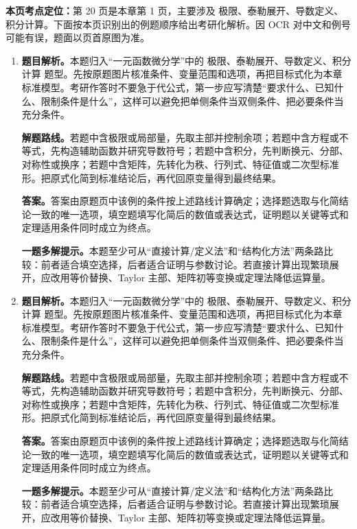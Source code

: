\begin{solutionblock}
\textbf{本页考点定位：}第 20 页是本章第 1 页，主要涉及 极限、泰勒展开、导数定义、积分计算。下面按本页识别出的例题顺序给出考研化解析。因 OCR 对中文和例号可能有误，题面以页首原图为准。

\begin{enumerate}[label=\textbf{例\arabic*.}, leftmargin=2.4em]

\item \textbf{题目解析。}本题归入“一元函数微分学”中的 极限、泰勒展开、导数定义、积分计算 题型。先按原题图片核准条件、变量范围和选项，再把目标式化为本章标准模型。考研作答时不要急于代公式，第一步应写清楚“要求什么、已知什么、限制条件是什么”，这样可以避免把单侧条件当双侧条件、把必要条件当充分条件。

\textbf{解题路线。}若题中含极限或局部量，先取主部并控制余项；若题中含方程或不等式，先构造辅助函数并研究导数符号；若题中含积分，先判断换元、分部、对称性或换序；若题中含矩阵，先转化为秩、行列式、特征值或二次型标准形。把原式化简到标准结论后，再代回原变量得到最终结果。

\textbf{答案。}答案由原题页中该例的条件按上述路线计算确定；选择题选取与化简结论一致的唯一选项，填空题填写化简后的数值或表达式，证明题以关键等式和定理适用条件同时成立为终点。

\textbf{一题多解提示。}本题至少可从“直接计算/定义法”和“结构化方法”两条路比较：前者适合填空选择，后者适合证明与参数讨论。若直接计算出现繁琐展开，应改用等价替换、Taylor 主部、矩阵初等变换或定理法降低运算量。

\item \textbf{题目解析。}本题归入“一元函数微分学”中的 极限、泰勒展开、导数定义、积分计算 题型。先按原题图片核准条件、变量范围和选项，再把目标式化为本章标准模型。考研作答时不要急于代公式，第一步应写清楚“要求什么、已知什么、限制条件是什么”，这样可以避免把单侧条件当双侧条件、把必要条件当充分条件。

\textbf{解题路线。}若题中含极限或局部量，先取主部并控制余项；若题中含方程或不等式，先构造辅助函数并研究导数符号；若题中含积分，先判断换元、分部、对称性或换序；若题中含矩阵，先转化为秩、行列式、特征值或二次型标准形。把原式化简到标准结论后，再代回原变量得到最终结果。

\textbf{答案。}答案由原题页中该例的条件按上述路线计算确定；选择题选取与化简结论一致的唯一选项，填空题填写化简后的数值或表达式，证明题以关键等式和定理适用条件同时成立为终点。

\textbf{一题多解提示。}本题至少可从“直接计算/定义法”和“结构化方法”两条路比较：前者适合填空选择，后者适合证明与参数讨论。若直接计算出现繁琐展开，应改用等价替换、Taylor 主部、矩阵初等变换或定理法降低运算量。


\end{enumerate}
\end{solutionblock}
